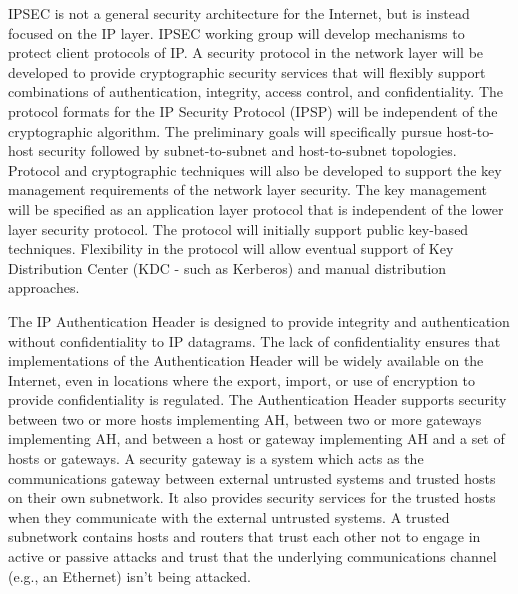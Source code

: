 \begin{htmllist}

    
    IPSEC is not a general security architecture for the Internet, but is
    instead focused on the IP layer. IPSEC working group will develop
    mechanisms to protect client protocols of IP. A security protocol in
    the network layer will be developed to provide cryptographic security
    services that will flexibly support combinations of authentication,
    integrity, access control, and confidentiality. The protocol formats
    for the IP Security Protocol (IPSP) will be independent of the
    cryptographic algorithm. The preliminary goals will specifically pursue
    host-to-host security followed by subnet-to-subnet and host-to-subnet
    topologies.\\
    
    Protocol and cryptographic techniques will also be developed to support
    the key management requirements of the network layer security. The key
    management will be specified as an application layer protocol that is
    independent of the lower layer security protocol. The protocol will
    initially support public key-based techniques. Flexibility in the
    protocol will allow eventual support of Key Distribution Center (KDC -
    such as Kerberos) and manual distribution approaches.\\

    
    The IP Authentication Header is designed to provide integrity and
    authentication without confidentiality to IP datagrams. The lack of
    confidentiality ensures that implementations of the Authentication
    Header will be widely available on the Internet, even in locations
    where the export, import, or use of encryption to provide
    confidentiality is regulated. The Authentication Header supports
    security between two or more hosts implementing AH, between two or more
    gateways implementing AH, and between a host or gateway implementing AH
    and a set of hosts or gateways. A security gateway is a system which
    acts as the communications gateway between external untrusted systems
    and trusted hosts on their own subnetwork. It also provides security
    services for the trusted hosts when they communicate with the external
    untrusted systems. A trusted subnetwork contains hosts and routers that
    trust each other not to engage in active or passive attacks and trust
    that the underlying communications channel (e.g., an Ethernet) isn't
    being attacked.\\


\end{htmllist}

